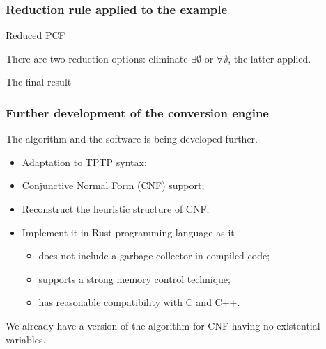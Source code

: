 \documentclass[aspectratio=169]{beamer}
\begin{document}
\begin{frame}

\frametitle{Reduction rule applied to the example}
\begin{block}{Reduced PCF}
\end{block}
There are two reduction options: eliminate $\exists\emptyset$ or $\forall\emptyset$, the latter applied.
\begin{block}{The final result}
\end{block}
\end{frame}

\begin{frame}

\frametitle{Further development of the conversion engine}
The algorithm and the software is being developed further.
\begin{block}{}
  \begin{itemize}
  \item Adaptation to TPTP syntax;
  \item Conjunctive Normal Form (CNF) support;
  \item Reconstruct the heuristic structure of CNF;
  \item Implement it in Rust programming language as it
    \begin{itemize}
    \item does not include a garbage collector in compiled code;
    \item supports a strong memory control technique;
    \item has reasonable compatibility with C and C++.
    \end{itemize}
  \end{itemize}
\end{block}
We already have a version of the algorithm for CNF having no existential variables.
\end{frame}
\end{document}
